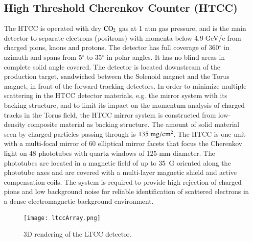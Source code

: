 \documentclass[final,3p,twocolumn]{elsarticle}
\begin{document}
\subsection{\rm High Threshold Cherenkov Counter (HTCC)}
\label{}
The HTCC is operated with dry $\rm CO_2$ gas at 1 atm gas pressure, and is the main detector to 
separate electrons (positrons) with momenta below 4.9 GeV/c from charged pions, kaons and protons. 
The detector has full coverage of 360$^\circ$ in azimuth and spans from 5$^\circ$ to 35$^\circ$ in polar angles.
It has no blind areas in complete solid angle covered. The detector is located downstream of the production target, 
sandwiched between the Solenoid magnet and the Torus magnet, in front of the forward tracking detectors. 
In order to minimize multiple scattering in the HTCC detector materials, e.g. the mirror system with its 
backing structure, and to limit its impact on the momentum analysis of charged tracks in the Torus field,
the HTCC mirror system is constructed from low-density composite material as backing structure. 
The amount of solid material seen by charged particles passing through is $135~\rm{mg/cm^2}$. 
The HTCC is one unit with a 
multi-focal mirror of 60 elliptical mirror facets that focus the Cherenkov light on 48  
phototubes with quartz windows of 125-mm diameter. The phototubes are located in a magnetic field 
of up to 35~G oriented along 
the phototube axes and are covered with a multi-layer magnetic shield and active compensation coils. 
The system 
is required to provide high rejection of charged pions and low background noise for reliable 
identification of scattered electrons in a dense electromagnetic background environment. 
\begin{figure}[htbp!]
\centerline{\texttt{[image: ltccArray.png]}}
\caption{3D rendering of the LTCC detector.}
\label{ltcc}
\end{figure}
\end{document}
